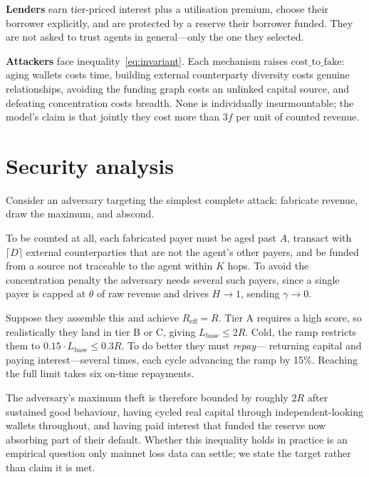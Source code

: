 \documentclass[11pt,a4paper]{article}
\begin{document}
\textbf{Lenders} earn tier-priced interest plus a utilisation premium, choose
their borrower explicitly, and are protected by a reserve their borrower funded.
They are not asked to trust agents in general---only the one they selected.

\textbf{Attackers} face inequality~\eqref{eq:invariant}. Each mechanism raises
$\mathrm{cost\_to\_fake}$: aging wallets costs time, building external
counterparty diversity costs genuine relationships, avoiding the funding graph
costs an unlinked capital source, and defeating concentration costs breadth. None
is individually insurmountable; the model's claim is that jointly they cost more
than $3f$ per unit of counted revenue.

\section{Security analysis}
\label{sec:security}

Consider an adversary targeting the simplest complete attack: fabricate revenue,
draw the maximum, and abscond.

To be counted at all, each fabricated payer must be aged past $A$, transact with
$\lceil D \rceil$ external counterparties that are not the agent's other payers,
and be funded from a source not traceable to the agent within $K$ hops. To avoid
the concentration penalty the adversary needs several such payers, since a single
payer is capped at $\theta$ of raw revenue and drives $H \to 1$, sending
$\gamma \to 0$.

Suppose they assemble this and achieve $R_{\mathrm{eff}} = R$. Tier A requires a
high score, so realistically they land in tier B or C, giving
$L_{\mathrm{base}} \leq 2R$. Cold, the ramp restricts them to
$0.15 \cdot L_{\mathrm{base}} \leq 0.3R$. To do better they must \emph{repay}---
returning capital and paying interest---several times, each cycle advancing the
ramp by 15\%. Reaching the full limit takes six on-time repayments.

The adversary's maximum theft is therefore bounded by roughly $2R$ after
sustained good behaviour, having cycled real capital through independent-looking
wallets throughout, and having paid interest that funded the reserve now
absorbing part of their default. Whether this inequality holds in practice is an
empirical question only mainnet loss data can settle; we state the target rather
than claim it is met.
\end{document}

